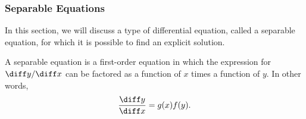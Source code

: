 \begin{frame}
\frametitle{Separable Equations}
In this section, we will discuss a type of differential equation, called a separable equation, for which it is possible to find an explicit solution.

\begin{definition}
A separable equation is a first-order equation in which the expression for $\diff y/\diff x$ can be factored as a function of $x$ times a function of $y$.  In other words,
\[
\frac{\diff y}{\diff x} = g(x)f(y).
\]
\end{definition}

%
\end{frame}
